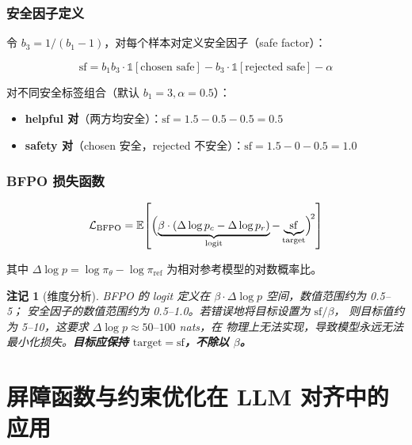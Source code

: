 \documentclass[12pt,a4paper,UTF8]{ctexart}
\newcommand{\E}{\mathbb{E}}
\newcommand{\piref}{\pi_{\mathrm{ref}}}
\newcommand{\pitheta}{\pi_{\theta}}
\newtheorem{remark}{注记}
\begin{document}
\subsubsection{安全因子定义}

令 $b_3 = 1/(b_1-1)$，对每个样本对定义安全因子（safe factor）：

\begin{equation}
  \mathrm{sf}
    = b_1 b_3 \cdot \mathbb{1}[\text{chosen safe}]
      - b_3 \cdot \mathbb{1}[\text{rejected safe}]
      - \alpha
  \label{eq:bfpo_sf}
\end{equation}

对不同安全标签组合（默认 $b_1=3, \alpha=0.5$）：

\begin{itemize}[leftmargin=2em]
  \item \textbf{helpful 对}（两方均安全）：$\mathrm{sf} = 1.5 - 0.5 - 0.5 = 0.5$
  \item \textbf{safety 对}（chosen 安全，rejected 不安全）：$\mathrm{sf} = 1.5 - 0 - 0.5 = 1.0$
\end{itemize}

\subsubsection{BFPO 损失函数}

\begin{equation}
  \mathcal{L}_{\mathrm{BFPO}}
    = \E\!\left[\Bigl(
        \underbrace{\beta\cdot(\Delta\log p_c - \Delta\log p_r)}_{\text{logit}}
        -
        \underbrace{\mathrm{sf}}_{\text{target}}
      \Bigr)^{\!2}\right]
  \label{eq:bfpo_loss}
\end{equation}

其中 $\Delta\log p = \log\pitheta - \log\piref$ 为相对参考模型的对数概率比。

\begin{remark}[维度分析]
BFPO 的 logit 定义在 $\beta\cdot\Delta\log p$ 空间，数值范围约为 0.5--5；
安全因子的数值范围约为 0.5--1.0。若错误地将目标设置为 $\mathrm{sf}/\beta$，
则目标值约为 5--10，这要求 $\Delta\log p \approx 50\text{--}100$ nats，在
物理上无法实现，导致模型永远无法最小化损失。\textbf{目标应保持
$\mathrm{target} = \mathrm{sf}$，不除以 $\beta$。}
\end{remark}

\section{屏障函数与约束优化在 LLM 对齐中的应用}
\label{sec:barrier}
\end{document}
